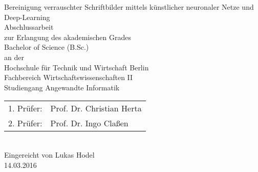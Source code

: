 

\begin{titlepage}
  \begin{center}
    \huge
    Bereinigung verrauschter Schriftbilder mittels künstlicher neuronaler Netze und Deep-Learning\\
    \vspace{1cm}\huge
    Abschlussarbeit\\
    \vspace{1cm}\large
    {\large zur Erlangung des akademischen Grades}\\
    {\large Bachelor of Science (B.Sc.)}\\
    \vspace{1cm}\large
    {\large an der}\\
    \vspace{1cm}\large
		{\large Hochschule für Technik und Wirtschaft Berlin}\\
    {\large Fachbereich Wirtschaftswissenschaften II}\\
    {\large Studiengang Angewandte Informatik}\\
    \vspace{1cm}\large
    \begin{tabular}{ll}
      1. Prüfer:            & Prof. Dr. Christian Herta\\
      2. Prüfer:            & Prof. Dr. Ingo Claßen\\
    \end{tabular}
    \vspace{1cm}\large
    \\
		Eingereicht von Lukas Hodel\\
    \vspace{1cm}\large
    14.03.2016

  \end{center}

\end{titlepage}
